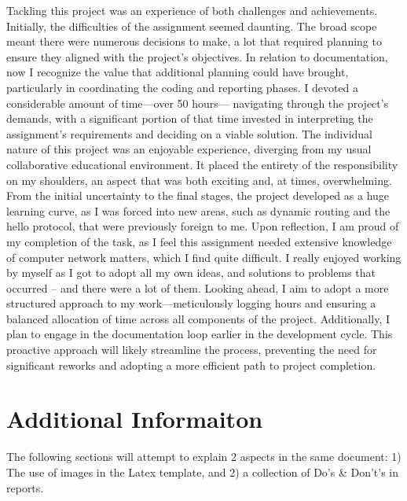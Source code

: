 \documentclass{article}
\begin{document}
Tackling this project was an experience of both challenges and achievements. Initially, the difficulties of the assignment seemed daunting. The broad scope meant there were numerous decisions to make, a lot that required planning to ensure they aligned with the project's objectives. In relation to documentation, now I recognize the value that additional planning could have brought, particularly in coordinating the coding and reporting phases. I devoted a considerable amount of time—over 50 hours— navigating through the project's demands, with a significant portion of that time invested in interpreting the assignment's requirements and deciding on a viable solution.
The individual nature of this project was an enjoyable experience, diverging from my usual collaborative educational environment. It placed the entirety of the responsibility on my shoulders, an aspect that was both exciting and, at times, overwhelming. From the initial uncertainty to the final stages, the project developed as a huge learning curve, as I was forced into new areas, such as dynamic routing and the hello protocol, that were previously foreign to me.
Upon reflection, I am proud of my completion of the task, as I feel this assignment needed extensive knowledge of computer network matters, which I find quite difficult. I really enjoyed working by myself as I got to adopt all my own ideas, and solutions to problems that occurred – and there were a lot of them. Looking ahead, I aim to adopt a more structured approach to my work—meticulously logging hours and ensuring a balanced allocation of time across all components of the project. Additionally, I plan to engage in the documentation loop earlier in the development cycle. This proactive approach will likely streamline the process, preventing the need for significant reworks and adopting a more efficient path to project completion.



%

 



\appendix
\section{Additional Informaiton}

The following sections will attempt to explain 2 aspects in the same document: 1) The use of images in the Latex template, and 2) a collection of Do's \& Don't's in reports.

\end{document}
